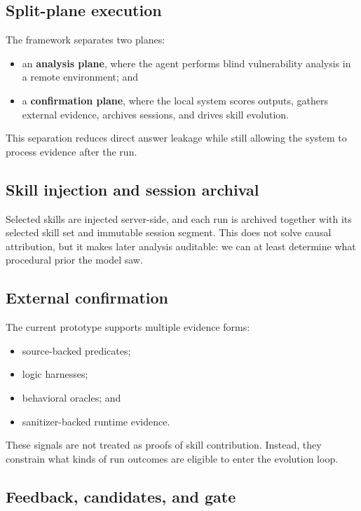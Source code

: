 \documentclass[11pt]{article}
\begin{document}
\subsection{Split-plane execution}

The framework separates two planes:
\begin{itemize}[leftmargin=*]
    \item an \textbf{analysis plane}, where the agent performs blind vulnerability
    analysis in a remote environment; and
    \item a \textbf{confirmation plane}, where the local system scores outputs, gathers
    external evidence, archives sessions, and drives skill evolution.
\end{itemize}

This separation reduces direct answer leakage while still allowing the system to process
evidence after the run.

\subsection{Skill injection and session archival}

Selected skills are injected server-side, and each run is archived together with its
selected skill set and immutable session segment.  This does not solve causal
attribution, but it makes later analysis auditable: we can at least determine what
procedural prior the model saw.

\subsection{External confirmation}

The current prototype supports multiple evidence forms:
\begin{itemize}[leftmargin=*]
    \item source-backed predicates;
    \item logic harnesses;
    \item behavioral oracles; and
    \item sanitizer-backed runtime evidence.
\end{itemize}

These signals are not treated as proofs of skill contribution.  Instead, they constrain
what kinds of run outcomes are eligible to enter the evolution loop.

\subsection{Feedback, candidates, and gate}
\end{document}
